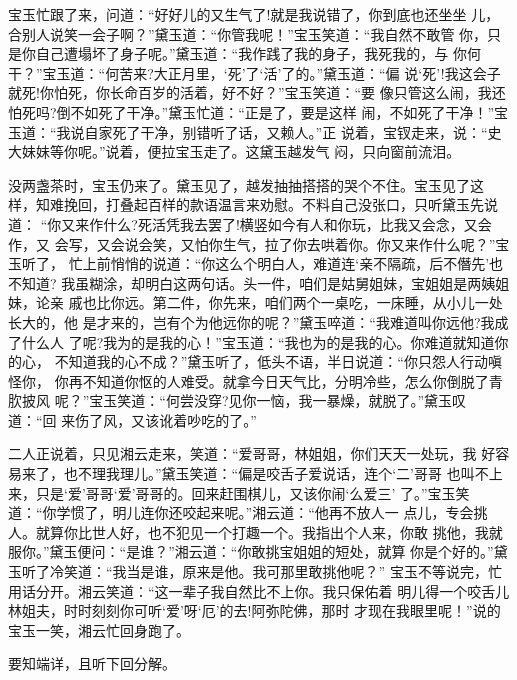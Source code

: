 宝玉忙跟了来，问道：“好好儿的又生气了!就是我说错了，你到底也还坐坐
儿，合别人说笑一会子啊？”黛玉道：“你管我呢！”宝玉笑道：“我自然不敢管
你，只是你自己遭塌坏了身子呢。”黛玉道：“我作践了我的身子，我死我的，与
你何干？”宝玉道：“何苦来?大正月里，‘死’了‘活’了的。”黛玉道：“偏
说‘死’!我这会子就死!你怕死，你长命百岁的活着，好不好？”宝玉笑道：“要
像只管这么闹，我还怕死吗?倒不如死了干净。”黛玉忙道：“正是了，要是这样
闹，不如死了干净！”宝玉道：“我说自家死了干净，别错听了话，又赖人。”正
说着，宝钗走来，说：“史大妹妹等你呢。”说着，便拉宝玉走了。这黛玉越发气
闷，只向窗前流泪。

没两盏茶时，宝玉仍来了。黛玉见了，越发抽抽搭搭的哭个不住。宝玉见了这
样，知难挽回，打叠起百样的款语温言来劝慰。不料自己没张口，只听黛玉先说道：
“你又来作什么?死活凭我去罢了!横竖如今有人和你玩，比我又会念，又会作，又
会写，又会说会笑，又怕你生气，拉了你去哄着你。你又来作什么呢？”宝玉听了，
忙上前悄悄的说道：“你这么个明白人，难道连‘亲不隔疏，后不僭先’也不知道?
我虽糊涂，却明白这两句话。头一件，咱们是姑舅姐妹，宝姐姐是两姨姐妹，论亲
戚也比你远。第二件，你先来，咱们两个一桌吃，一床睡，从小儿一处长大的，他
是才来的，岂有个为他远你的呢？”黛玉啐道：“我难道叫你远他?我成了什么人
了呢?我为的是我的心！”宝玉道：“我也为的是我的心。你难道就知道你的心，
不知道我的心不成？”黛玉听了，低头不语，半日说道：“你只怨人行动嗔怪你，
你再不知道你怄的人难受。就拿今日天气比，分明冷些，怎么你倒脱了青肷披风
呢？”宝玉笑道：“何尝没穿?见你一恼，我一暴燥，就脱了。”黛玉叹道：“回
来伤了风，又该讹着吵吃的了。”

二人正说着，只见湘云走来，笑道：“爱哥哥，林姐姐，你们天天一处玩，我
好容易来了，也不理我理儿。”黛玉笑道：“偏是咬舌子爱说话，连个‘二’哥哥
也叫不上来，只是‘爱’哥哥‘爱’哥哥的。回来赶围棋儿，又该你闹‘么爱三’
了。”宝玉笑道：“你学惯了，明儿连你还咬起来呢。”湘云道：“他再不放人一
点儿，专会挑人。就算你比世人好，也不犯见一个打趣一个。我指出个人来，你敢
挑他，我就服你。”黛玉便问：“是谁？”湘云道：“你敢挑宝姐姐的短处，就算
你是个好的。”黛玉听了冷笑道：“我当是谁，原来是他。我可那里敢挑他呢？”
宝玉不等说完，忙用话分开。湘云笑道：“这一辈子我自然比不上你。我只保佑着
明儿得一个咬舌儿林姐夫，时时刻刻你可听‘爱’呀‘厄’的去!阿弥陀佛，那时
才现在我眼里呢！”说的宝玉一笑，湘云忙回身跑了。

要知端详，且听下回分解。